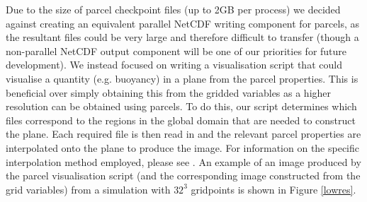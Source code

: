\documentclass{article}
\begin{document}
Due to the size of parcel checkpoint files (up to 2GB per process) we decided against creating an equivalent parallel NetCDF writing component for parcels, as the resultant files could be very large and therefore difficult to transfer (though a non-parallel NetCDF output component will be one of our priorities for future development). We instead focused on writing a visualisation script that could visualise a quantity (e.g. buoyancy) in a plane from the parcel properties. This is beneficial over simply obtaining this from the gridded variables as a higher resolution can be obtained using parcels. To do this, our script determines which files correspond to the regions in the global domain that are needed to construct the plane. Each required file is then read in and the relevant parcel properties are interpolated onto the plane to produce the image. For information on the specific interpolation method employed, please see \citet{Boeing2018}. An example of an image produced by the parcel visualisation script (and the corresponding image constructed from the grid variables) from a simulation with $32^3$ gridpoints is shown in Figure \ref{lowres}.
\end{document}
